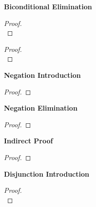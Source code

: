 \begin{multicols}{2}
\vspace{1em}\noindent\textbf{Biconditional Elimination}
\begin{proof}
\\	
	 
\end{proof}

\end{multicols}

\newpage
\begin{multicols}{2}
\begin{proof}
\\	
	 
\end{proof}



\vspace{1em}\noindent\textbf{Negation Introduction}

\begin{proof}
	\open
	 
	\close
\end{proof}


\vspace{1em}\noindent\textbf{Negation Elimination}

\begin{proof}
\end{proof}

\vspace{1em}\noindent\textbf{Indirect Proof}

\begin{proof}
	\open
	 
	\close
\end{proof}

\vspace{1em}\noindent\textbf{Disjunction Introduction}

\begin{proof}

\\	
\end{proof}


\end{multicols}

